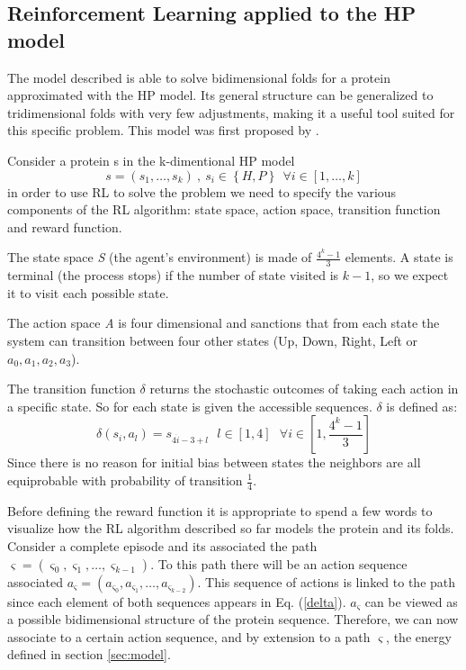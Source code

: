 \subsection{Reinforcement Learning applied to the HP model}
The model described is able to solve bidimensional folds for a protein approximated with the HP model.
Its general structure can be generalized to tridimensional folds with very few adjustments, making it a useful tool suited for this specific problem.
This model was first proposed by \cite{czibula2011reinforcement}.

Consider a protein s in the k-dimentional HP model $$s = \left(s_1, \ldots, s_k\right) \ , \ s_i \in \left\{H, P\right\} \ \ \forall i \in \left[1,\ldots,k\right]$$ in order to use RL to solve the problem we need to specify the various components of the RL algorithm: state space, action space, transition function and reward function.

The state space \emph{S} (the agent's environment) is made of $\frac{4^{k}-1}{3}$ elements.
A state is terminal (the process stops) if the number of state visited is $k-1$, so we expect it to visit each possible state. 

The action space \emph{A} is four dimensional and sanctions that from each state the system can transition between four other states (Up, Down, Right, Left or $a_{0}, a_{1}, a_{2}, a_{3}$).

The transition function $\delta$ returns the stochastic outcomes of taking each action in a specific state.
So for each state is given the accessible sequences.
$\delta$ is defined as:
\begin{equation} \label{delta}
\delta(s_{i},a_{l})=s_{4 \dot i - 3 + l} \ \ \ l \in [1, 4] \ \ \ \forall i \in \left[1,\frac{4^{k}-1}{3}\right]
\end{equation}
Since there is no reason for initial bias between states the neighbors are all equiprobable with probability of transition $\frac{1}{4}$.

Before defining the reward function it is appropriate to spend a few words to visualize how the RL algorithm described so far models the protein and its folds.
Consider a complete episode and its associated the path $\varsigma = (\varsigma_{0}, \varsigma_1, \ldots , \varsigma_{k-1})$.
To this path there will be an action sequence associated $a_{\varsigma} = (a_{\varsigma_{0}}, a_{\varsigma_{1}}, \ldots , a_{\varsigma_{k-2}})$.
This sequence of actions is linked to the path since each element of both sequences appears in Eq. (\ref{delta}).
$a_{\varsigma}$ can be viewed as a possible bidimensional structure of the protein sequence.
Therefore, we can now associate to a certain action sequence, and by extension to a path $\varsigma$, the energy defined in section \ref{sec:model}. 

